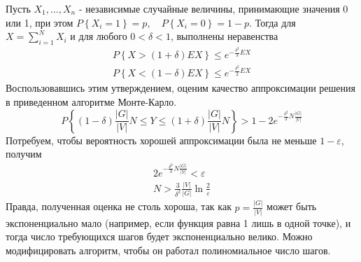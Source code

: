 \begin{problem}
\noindent Пусть $X_{1} ,...,X_{n} $ - независимые случайные величины, принимающие значения 0 или 1, при этом $P\left\{X_{i} =1\right\}=p,\quad P\left\{X_{i} =0\right\}=1-p$. Тогда для $X=\sum _{i=1}^{N}X_{i}  $ и для любого $0<\delta <1$, выполнены неравенства
\[\begin{array}{l} {P\left\{X>(1+\delta )EX\right\}\le e^{-\frac{\delta ^{2} }{3} EX} } \\ {P\left\{X<(1-\delta )EX\right\}\le e^{-\frac{\delta ^{2} }{2} EX} } \end{array}\] 
Воспользовавшись этим утверждением, оценим качество аппроксимации решения в приведенном алгоритме Монте-Карло.
\[P\left\{(1-\delta )\frac{\left|G\right|}{\left|V\right|} N\le Y\le (1+\delta )\frac{\left|G\right|}{\left|V\right|} N\right\}>1-2e^{-\frac{\delta ^{2} }{3} N\frac{\left|G\right|}{\left|V\right|} } \] 
Потребуем, чтобы вероятность хорошей аппроксимации была не меньше $1-\varepsilon $, получим
\[\begin{array}{l} {2e^{-\frac{\delta ^{2} }{3} N\frac{\left|G\right|}{\left|V\right|} } <\varepsilon } \\ {N>\frac{3}{\delta ^{2} } \frac{\left|V\right|}{\left|G\right|} \ln \frac{2}{\varepsilon } } \end{array}\] 
Правда, полученная оценка не столь хороша, так как $p=\frac{\left|G\right|}{\left|V\right|} $ может быть экспоненциально мало (например, если функция равна 1 лишь в одной точке), и тогда число требующихся шагов будет экспоненциально велико. Можно модифицировать алгоритм, чтобы он работал полиномиальное число шагов.

\end{problem}


